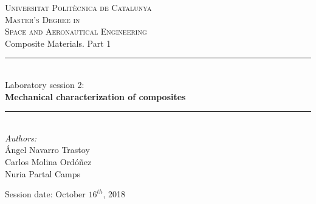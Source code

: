 
\begin{titlepage}

\newcommand{\HRule}{\rule{\linewidth}{0.5mm}} %

\center %


\textsc{\LARGE Universitat Politècnica de Catalunya}\\[0.5cm]
\textsc{\Large Master's Degree in\\ Space and Aeronautical Engineering}\\[1.8cm]

\Large Composite Materials. Part 1\\





\HRule \\[0.2cm]
\Large Laboratory session 2:\\[0.5cm]
{ \Large \bfseries
Mechanical characterization of composites\\[0cm]
}
\HRule \\[3.5cm]


\emph{Authors:}\\
{ \normalsize
Ángel Navarro Trastoy\\
Carlos Molina Ordóñez\\
Nuria Partal Camps\\[1cm]
}

{\normalsize Session date: October $16^{th}$, 2018}\\[2cm] %



\vfill %

\end{titlepage}
